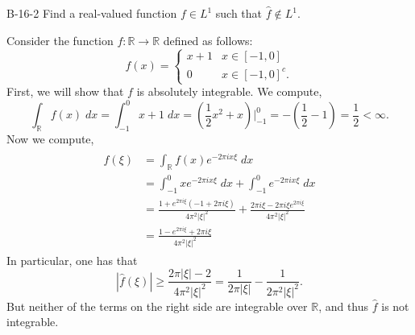 \documentclass{article}
\begin{document}
	\begin{prb}{B-16-2}
		Find a real-valued function $f \in L^1$ such that $\hat{f} \notin L^1$. 
	\end{prb}
	Consider the function $f: \mathbb{R} \to \mathbb{R}$ defined as follows: 
	\begin{equation*}
		f(x) = 
		\begin{cases}
			x + 1 & x \in [-1,0] \\
			0 & x\in [-1,0]^{c}. 
		\end{cases}
	\end{equation*}
	First, we will show that $f$ is absolutely integrable. We compute, 
	\begin{equation*}
		\int_{\mathbb{R}}f(x)\;dx = \int_{-1}^{0}x + 1\;dx = \left(\frac{1}{2}x^{2} + x\right)\bigg|_{-1}^{0} = -\left(\frac{1}{2} - 1\right) = \frac{1}{2} < \infty. 
	\end{equation*}
	Now we compute, 
	\begin{align*}
		\begin{split}
			\hat{f}(\xi) &= \int_{\mathbb{R}}f(x)e^{-2\pi i x \xi}\;dx \\
			&= \int_{-1}^{0}xe^{-2\pi i x \xi}\;dx + \int_{-1}^{0}e^{-2\pi i x \xi}\;dx \\
			&= \frac{1 + e^{2\pi i \xi}(-1 + 2\pi i \xi)}{4\pi^2 |\xi|^2} + \frac{2\pi i \xi - 2\pi i \xi e^{2\pi i \xi}}{4\pi^2 |\xi|^2} \\
			&= \frac{1 -e^{2\pi i \xi} + 2\pi i \xi}{4\pi^2|\xi|^2}
		\end{split}
	\end{align*}
	In particular, one has that 
	\begin{equation*}
		|\hat{f}(\xi)| \geq \frac{2\pi |\xi| - 2}{4\pi^2|\xi|^{2}} = \frac{1}{2\pi  |\xi|} - \frac{1}{2\pi^2|\xi|^{2}}. 
	\end{equation*}
	But neither of the terms on the right side are integrable over $\mathbb{R}$, and thus $\hat{f}$ is not integrable. 
	
\end{document}
